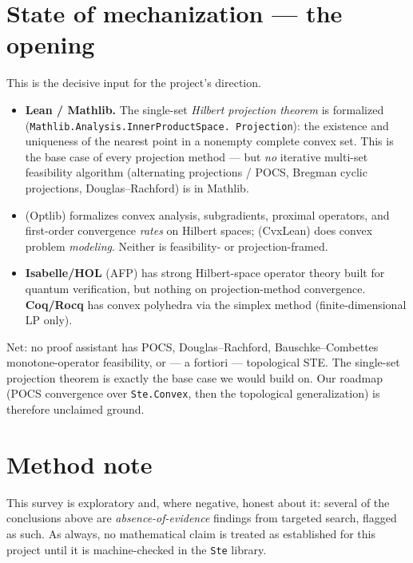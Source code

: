 \documentclass[11pt]{article}
\begin{document}
\section{State of mechanization --- the opening}
This is the decisive input for the project's direction.
\begin{itemize}
\item \textbf{Lean / Mathlib.}  The single-set \emph{Hilbert projection
  theorem} is formalized (\texttt{Mathlib.Analysis.InnerProductSpace.\allowbreak
  Projection}): the existence and uniqueness of the nearest point in a
  nonempty complete convex set.  This is the base case of every
  projection method --- but \emph{no} iterative multi-set feasibility
  algorithm (alternating projections / POCS, Bregman cyclic projections,
  Douglas--Rachford) is in Mathlib.
\item \citet{li2024optlib} (Optlib) formalizes convex analysis,
  subgradients, proximal operators, and first-order convergence \emph{rates}
  on Hilbert spaces; \citet{cvxlean} (CvxLean) does convex problem
  \emph{modeling}.  Neither is feasibility- or projection-framed.
\item \textbf{Isabelle/HOL} (AFP) has strong Hilbert-space operator
  theory built for quantum verification, but nothing on projection-method
  convergence.  \textbf{Coq/Rocq} has convex polyhedra via the simplex
  method (finite-dimensional LP only).
\end{itemize}
Net: no proof assistant has POCS, Douglas--Rachford, Bauschke--Combettes
monotone-operator feasibility, or --- a fortiori --- topological STE.  The
single-set projection theorem is exactly the base case we would build on.
Our roadmap (POCS convergence over \texttt{Ste.Convex}, then the
topological generalization) is therefore unclaimed ground.

\section*{Method note}
This survey is exploratory and, where negative, honest about it: several
of the conclusions above are \emph{absence-of-evidence} findings from
targeted search, flagged as such.  As always, no mathematical claim is
treated as established for this project until it is machine-checked in the
\texttt{Ste} library.



\end{document}
